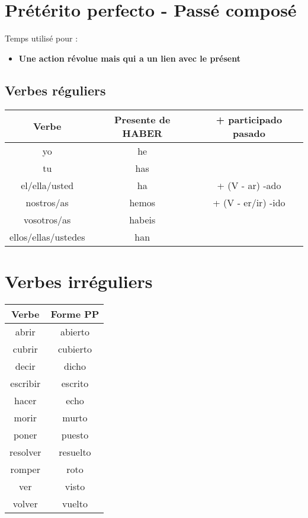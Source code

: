 \section{Prétérito perfecto - Passé composé}
Temps utilisé pour : 
\begin{itemize}
    \item \textbf{Une action révolue mais qui a un lien avec le présent}
\end{itemize}
\subsection{Verbes réguliers}
\begin{table}[hbt!]
    \centering
    \setlength\tabcolsep{20pt}
    \begin{tabular}{|c||c|c|}
        \hline
        Verbe              & Presente de HABER & + participado pasado \\
        \hline
        yo & he &  \\
        tu & has &  \\
        el/ella/usted & ha & + (V - ar) -ado\\
        nostros/as & hemos & + (V - er/ir) -ido \\
        vosotros/as & habeis &  \\
        ellos/ellas/ustedes & han &  \\
        \hline
    \end{tabular}
    \label{tab:label2}
\end{table}
\section{Verbes irréguliers}
\begin{table}[hbt!]
    \centering
    \setlength\tabcolsep{25pt}
    \begin{tabular}{|c||c|}
        \hline
        Verbe              & Forme PP \\
        \hline
        abrir & abierto   \\
        \hline
        cubrir & cubierto \\
        \hline
        decir & dicho     \\
        \hline
        escribir & escrito\\
        \hline
        hacer & echo      \\
        \hline
        morir & murto     \\
        \hline
        poner & puesto    \\
        \hline
        resolver & resuelto\\
        \hline
        romper & roto     \\
        \hline
        ver & visto       \\
        \hline
        volver & vuelto   \\
        \hline
    \end{tabular}
    \label{tab:label2}
\end{table}
\newpage

